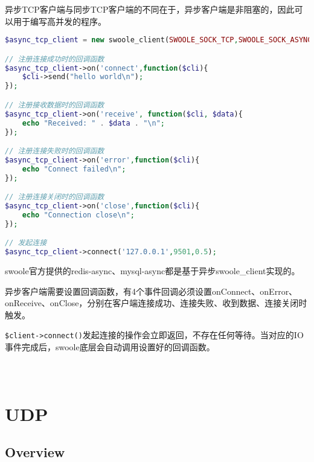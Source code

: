 异步TCP客户端与同步TCP客户端的不同在于，异步客户端是非阻塞的，因此可以用于编写高并发的程序。

\begin{lstlisting}[language=PHP]
$async_tcp_client = new swoole_client(SWOOLE_SOCK_TCP,SWOOLE_SOCK_ASYNC);

// 注册连接成功时的回调函数
$async_tcp_client->on('connect',function($cli){
	$cli->send("hello world\n");
});

// 注册接收数据时的回调函数
$async_tcp_client->on('receive', function($cli, $data){
	echo "Received: " . $data . "\n";
});

// 注册连接失败时的回调函数
$async_tcp_client->on('error',function($cli){
	echo "Connect failed\n";
});

// 注册连接关闭时的回调函数
$async_tcp_client->on('close',function($cli){
	echo "Connection close\n";
});

// 发起连接
$async_tcp_client->connect('127.0.0.1',9501,0.5);
\end{lstlisting}

swoole官方提供的redis-async、mysql-async都是基于异步swoole\_client实现的。

异步客户端需要设置回调函数，有4个事件回调必须设置onConnect、onError、onReceive、onClose，分别在客户端连接成功、连接失败、收到数据、连接关闭时触发。

\texttt{\$client->connect()}发起连接的操作会立即返回，不存在任何等待。当对应的IO事件完成后，swoole底层会自动调用设置好的回调函数。


\begin{lstlisting}[language=PHP]

\end{lstlisting}



\begin{lstlisting}[language=PHP]

\end{lstlisting}




\begin{lstlisting}[language=PHP]

\end{lstlisting}




\chapter{UDP}


\section{Overview}

